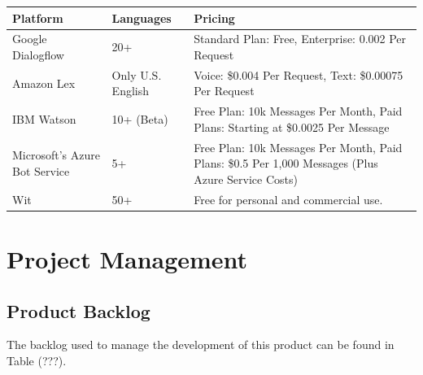 \documentclass[titlepage, 12pt]{article}
\begin{document}
\begin{center}
    \begin{tabular}{ L{2cm} L{3cm} L{4.5cm} }
        \toprule
        \textbf{Platform} & \textbf{Languages} & \textbf{Pricing}
        \tabularnewline
        \midrule
        Google Dialogflow & 20+ & Standard Plan: Free, Enterprise: 0.002 Per Request
        \tabularnewline
        \midrule 
        Amazon Lex & Only U.S. English & Voice: \$0.004 Per Request, Text: \$0.00075 Per Request
        \tabularnewline
        \midrule
        IBM Watson & 10+ (Beta) & Free Plan: 10k Messages Per Month, Paid Plans: Starting at \$0.0025 Per Message
        \tabularnewline
        \midrule
        Microsoft’s Azure Bot Service & 5+ & Free Plan: 10k Messages Per Month, Paid Plans: \$0.5 Per 1,000 Messages (Plus Azure Service Costs)
        \tabularnewline
        \midrule
        Wit & 50+ & Free for personal and commercial use.
        \tabularnewline
        \bottomrule
    \end{tabular}

\end{center}

\pagebreak
\section{Project Management}

\subsection{Product Backlog}

The backlog used to manage the development of this product can be found in Table (???).
\end{document}

